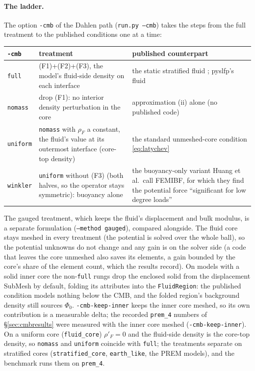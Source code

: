 \documentclass[11pt]{article}
\numberwithin{equation}{section}
\newcommand{\code}[1]{\texttt{#1}}
\begin{document}
\paragraph{The ladder.}
The option \code{-cmb} of the Dahlen path (\code{run.py --cmb}) takes the
steps from the full treatment to the published conditions one at a time:
\begin{center}
\small
\begin{tabular}{@{}lP{6.4cm}P{5.6cm}@{}}
\toprule
\code{-cmb} & treatment & published counterpart \\
\midrule
\code{full} & (F1)+(F2)+(F3), the model's fluid-side density on each interface & the static stratified fluid \cite{Dahlen1974,AW10}; pyslfp's fluid \\
\code{nomass} & drop (F1): no interior density perturbation in the core & approximation (ii) alone (no published code) \\
\code{uniform} & \code{nomass} with $\rho_F$ a constant, the fluid's value at its outermost interface (core-top density) & the standard unmeshed-core condition \eqref{eq:latychev} \cite{TrompMitrovica1999,Latychev2005,AWahrZhong2013,Huang2023,CitcomSVE2025} \\
\code{winkler} & \code{uniform} without (F3) (both halves, so the operator stays symmetric): buoyancy alone & the buoyancy-only variant Huang et al.\ call FEMIBF, for which they find the potential force ``significant for low degree loads'' \cite{Huang2023} \\
\bottomrule
\end{tabular}
\end{center}
The gauged treatment, which keeps the fluid's displacement and bulk
modulus, is a separate formulation (\code{--method gauged}), compared
alongside. The fluid core stays meshed in every treatment (the potential
is solved over the whole ball), so the potential unknowns do not change
and any gain is on the solver side (a code that leaves the core unmeshed
also saves its elements, a gain bounded by the core's share of the
element count, which the results record). On models with a solid inner
core the non-\code{full} rungs drop the enclosed solid from the
displacement SubMesh by default, folding its attributes into the
\code{FluidRegion}: the published condition models nothing below the
CMB, and the folded region's background density still sources $\Phi_0$.
\code{-cmb-keep-inner} keeps the inner core meshed, so its own
contribution is a measurable delta; the recorded \code{prem\_4} numbers
of \S\ref{sec:cmbresults} were measured with the inner core meshed
(\code{-cmb-keep-inner}). On a
uniform core (\code{fluid\_core}) $\rho'_F=0$ and the fluid-side density is
the core-top density, so \code{nomass} and \code{uniform} coincide with
\code{full}; the treatments separate on stratified cores
(\code{stratified\_core}, \code{earth\_like}, the PREM models), and the
benchmark runs them on \code{prem\_4}.
\end{document}
